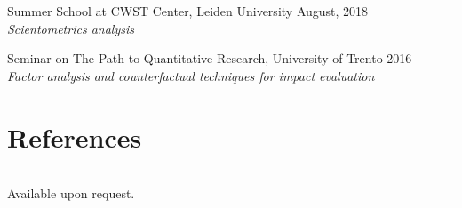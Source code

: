\documentclass[12pt,]{article}
\begin{document}
Summer School at CWST Center, Leiden University
\hfill \begingroup\small August, 2018\endgroup\\
\emph{Scientometrics analysis}

Seminar on The Path to Quantitative Research, University of Trento
\hfill \begingroup\small 2016\endgroup\\
\emph{Factor analysis and counterfactual techniques for impact
evaluation} \newline

\hypertarget{references}{%
\section{References}\label{references}}

\vspace{-10pt}
\rule{1\linewidth}{\linethickness}

Available upon request.
\end{document}
